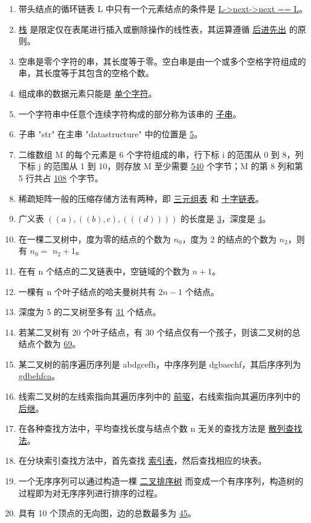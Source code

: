 \documentclass[12pt, a4paper]{article}
\begin{document}
\begin{enumerate}
    \item 带头结点的循环链表 L 中只有一个元素结点的条件是 \underline{L->next->next == L}。
    \item \underline{栈} 是限定仅在表尾进行插入或删除操作的线性表，其运算遵循 \underline{后进先出} 的原则。
    \item 空串是零个字符的串，其长度等于零。空白串是由一个或多个空格字符组成的串，其长度等于其包含的空格个数。
    \item 组成串的数据元素只能是 \underline{单个字符}。
    \item 一个字符串中任意个连续字符构成的部分称为该串的 \underline{子串}。
    \item 子串 "str" 在主串 "datastructure" 中的位置是 \underline{5}。
    \item 二维数组 M 的每个元素是 6 个字符组成的串，行下标 i 的范围从 0 到 8，列下标 j 的范围从 1 到 10，则存放 M 至少需要 \underline{540} 个字节；M 的第 8 列和第 5 行共占 \underline{108} 个字节。
    \item 稀疏矩阵一般的压缩存储方法有两种，即 \underline{三元组表} 和 \underline{十字链表}。
    \item 广义表 $((a), ((b), c), (((d))))$ 的长度是 \underline{3}，深度是 \underline{4}。
    \item 在一棵二叉树中，度为零的结点的个数为 $n_0$，度为 2 的结点的个数为 $n_2$，则有 $n_0 =$ \underline{$n_2+1$}。
    \item 在有 n 个结点的二叉链表中，空链域的个数为 \underline{$n+1$}。
    \item 一棵有 n 个叶子结点的哈夫曼树共有 \underline{$2n-1$} 个结点。
    \item 深度为 5 的二叉树至多有 \underline{31} 个结点。
    \item 若某二叉树有 20 个叶子结点，有 30 个结点仅有一个孩子，则该二叉树的总结点个数为 \underline{69}。
    \item 某二叉树的前序遍历序列是 abdgcefh，中序序列是 dgbaechf，其后序序列为 \underline{gdbehfca}。
    \item 线索二叉树的左线索指向其遍历序列中的 \underline{前驱}，右线索指向其遍历序列中的 \underline{后继}。
    \item 在各种查找方法中，平均查找长度与结点个数 n 无关的查找方法是 \underline{散列查找法}。
    \item 在分块索引查找方法中，首先查找 \underline{索引表}，然后查找相应的块表。
    \item 一个无序序列可以通过构造一棵 \underline{二叉排序树} 而变成一个有序序列，构造树的过程即为对无序序列进行排序的过程。
    \item 具有 10 个顶点的无向图，边的总数最多为 \underline{45}。

\end{enumerate}
\end{document}
